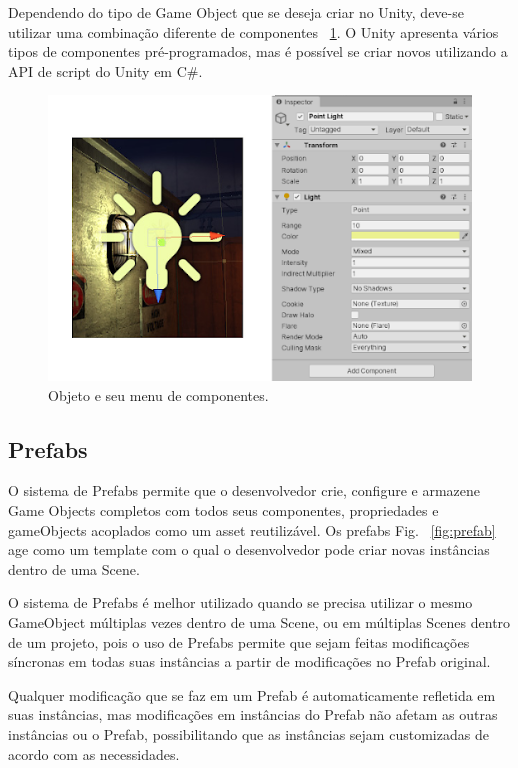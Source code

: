 \documentclass[
	12pt,				%
	openright,			%
	twoside,			%
	a4paper,			%
	english,			%
	french,				%
	spanish,			%
	brazil				%
	]{abntex2}
\begin{document}
Dependendo do tipo de Game Object que se deseja criar no Unity, deve-se utilizar uma combinação diferente de componentes ~\ref{fig:objprop}. O Unity apresenta vários tipos de componentes pré-programados, mas é possível se criar novos utilizando a API de script do Unity em C\#.
\begin{figure}
  \includegraphics[width=\linewidth, scale = 0.2]{objprop.jpg}
  \caption{Objeto e seu menu de componentes.}
  \label{fig:objprop}
\end{figure}
\pagebreak
\subsection{Prefabs}

O sistema de Prefabs permite que o desenvolvedor crie, configure e armazene Game Objects completos com todos seus componentes, propriedades e gameObjects acoplados como um asset reutilizável. Os prefabs Fig. ~\ref{fig:prefab} age como um template com o qual o desenvolvedor pode criar novas instâncias dentro de uma Scene.

	O sistema de Prefabs é melhor utilizado quando se precisa utilizar o mesmo GameObject múltiplas vezes dentro de uma Scene, ou em múltiplas Scenes dentro de um projeto, pois o uso de Prefabs permite que sejam feitas modificações síncronas em todas suas instâncias a partir de modificações no Prefab original.
	
	Qualquer modificação que se faz em um Prefab é automaticamente refletida em suas instâncias, mas modificações em instâncias do Prefab não afetam as outras instâncias ou o Prefab, possibilitando que as instâncias sejam customizadas de acordo com as necessidades.
	
\end{document}
